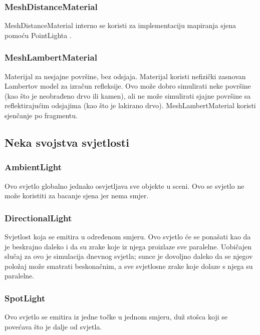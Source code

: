 \documentclass[a4paper,12pt]{article}
\begin{document}
\subsubsection{MeshDistanceMaterial}
\hspace{10mm} MeshDistanceMaterial interno se koristi za implementaciju mapiranja sjena pomoću PointLighta .

\subsubsection{MeshLambertMaterial}
Materijal za nesjajne površine, bez odsjaja.
Materijal koristi nefizički zasnovan Lambertov model za izračun refleksije. Ovo može dobro simulirati neke površine (kao što je neobrađeno drvo ili kamen), ali ne može simulirati sjajne površine sa reflektirajućim odsjajima (kao što je lakirano drvo). MeshLambertMaterial koristi sjenčanje po fragmentu.

\pagebreak
\subsection{Neka svojstva svjetlosti}
\subsubsection{AmbientLight}
\hspace{10mm} Ovo svjetlo globalno jednako osvjetljava sve objekte u sceni.
Ovo se svjetlo ne može koristiti za bacanje sjena jer nema smjer.

\subsubsection{DirectionalLight}
\hspace{10mm} Svjetlost koja se emitira u određenom smjeru. Ovo svjetlo će se ponašati kao da je beskrajno daleko i da su zrake koje iz njega proizlaze sve paralelne. Uobičajen slučaj za ovo je simulacija dnevnog svjetla; sunce je dovoljno daleko da se njegov položaj može smatrati beskonačnim, a sve svjetlosne zrake koje dolaze s njega su paralelne.

\subsubsection{SpotLight}
\hspace{10mm} Ovo svjetlo se emitira iz jedne točke u jednom smjeru, duž stošca koji se povećava što je dalje od svjetla.
\end{document}
